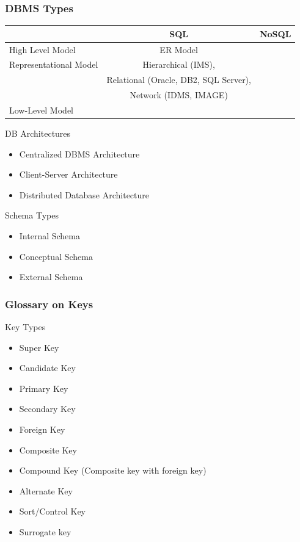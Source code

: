 \documentclass{beamer}
\begin{document}

\begin{frame}
\frametitle{DBMS Types}
	\begin{table}
		\begin{tabular}{l | c | c }
			  & SQL & NoSQL \\
			\hline 
			High Level Model & ER Model &  \\ 
			\hline
			Representational Model & Hierarchical (IMS), \\  & Relational (Oracle, DB2, SQL Server), \\  & Network (IDMS, IMAGE) &  \\
			\hline
			Low-Level Model &   & \\
			
		\end{tabular}
	\end{table}


	DB Architectures
	\begin{itemize}
		\item Centralized DBMS Architecture
		\item Client-Server Architecture
		\item Distributed Database Architecture
	\end{itemize}

	Schema Types
	\begin{itemize}
		\item Internal Schema
		\item Conceptual Schema
		\item External Schema
	\end{itemize}

\end{frame}


\begin{frame}
\frametitle{Glossary on Keys}
	Key Types
	\begin{itemize}
		\item Super Key
		\item Candidate Key
		\item Primary Key
		\item Secondary Key
		\item Foreign Key
		\item Composite Key
		\item Compound Key (Composite key with foreign key)
		\item Alternate Key
		\item Sort/Control Key
		\item Surrogate key
	\end{itemize}
\end{frame}
\end{document}
